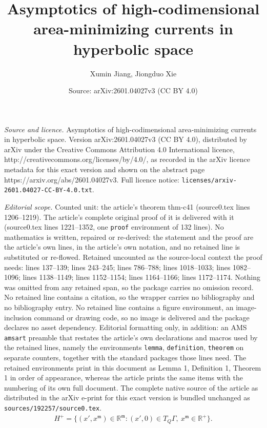 \documentclass[10pt,a4paper]{amsart}
\title{Asymptotics of high-codimensional area-minimizing currents in hyperbolic space}
\author{Xumin Jiang, Jiongduo Xie}
\date{Source: arXiv:2601.04027v3 (CC BY 4.0)}
\newcommand{\fm}{\mathfrak{m}}
\begin{document}
\maketitle

\noindent\emph{Source and licence.} Asymptotics of high-codimensional area-minimizing currents in hyperbolic space. Version arXiv:2601.04027v3 (CC BY 4.0), distributed by arXiv under the Creative Commons Attribution 4.0 International licence, http://creativecommons.org/licenses/by/4.0/, as recorded in the arXiv licence metadata for this exact version and shown on the abstract page https://arxiv.org/abs/2601.04027v3. Full licence notice: \texttt{licenses/arxiv-2601.04027-CC-BY-4.0.txt}.\par\smallskip

\noindent\textit{Editorial scope.} Counted unit: the article's theorem thm-c41 (source0.tex lines 1206--1219). The article's complete original proof of it is delivered with it (source0.tex lines 1221--1352, one \texttt{proof} environment of 132 lines). No mathematics is written, repaired or re-derived: the statement and the proof are the article's own lines, in the article's own notation, and no retained line is substituted or re-flowed.  Retained uncounted as the source-local context the proof needs: lines 137--139; lines 243--245; lines 786--788; lines 1018--1033; lines 1082--1096; lines 1138--1149; lines 1152--1154; lines 1164--1166; lines 1172--1174.  Nothing was omitted from any retained span, so the package carries no omission record.  No retained line contains a citation, so the wrapper carries no bibliography and no bibliography entry.  No retained line contains a figure environment, an image-inclusion command or drawing code, so no image is delivered and the package declares no asset dependency.  Editorial formatting only, in addition: an AMS \texttt{amsart} preamble that restates the article's own declarations and macros used by the retained lines, namely the environments \texttt{lemma}, \texttt{definition}, \texttt{theorem} on separate counters, together with the standard packages those lines need.  The retained environments print in this document as Lemma 1, Definition 1, Theorem 1 in order of appearance, whereas the article prints the same items with the numbering of its own full document.  The complete native source of the article as distributed in the arXiv e-print for this exact version is bundled unchanged as \texttt{sources/192257/source0.tex}.
\begin{align}\label{eq-H+-0}
    H^+ = \bigl\{(x', x^\fm)\in \mathbb{R}^\fm: (x',0) \in T_Q\Gamma,\ x^\fm \in \mathbb{R}^+\bigr\}.
\end{align}
\end{document}
